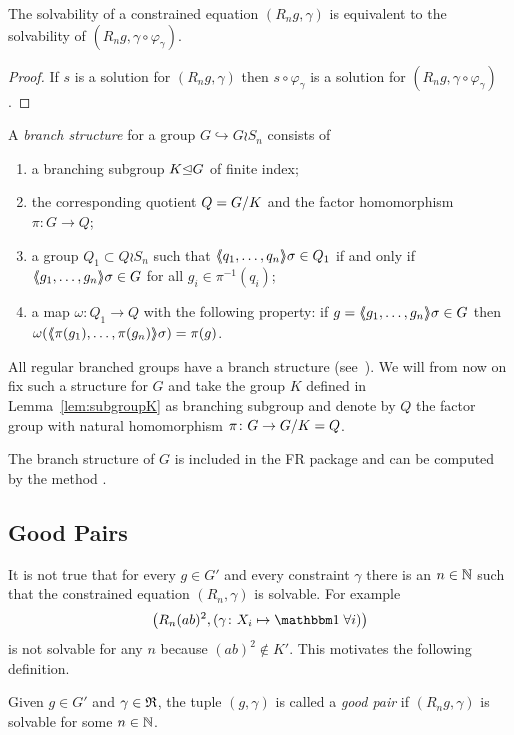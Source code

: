 \documentclass[a4paper,11pt]{amsart}
\begin{document}
\begin{lem} \label{lem:solvabilityWithReducedConstraint}
 The solvability of a constrained equation $(R_n g,\gamma)$ is equivalent to the 
 solvability of $(R_n g,\gamma\circ \varphi_\gamma)$.
\end{lem}
 \begin{proof}
 If $s$ is a solution for $(R_n g,\gamma)$ then $s\circ \varphi_\gamma$ is
 a solution for $(R_n g,\gamma\circ \varphi_\gamma)$. 
\end{proof}


\begin{defi} 
A \emph{branch structure} for a group $G\hookrightarrow G \wr S_n$ consists of  
\begin{enumerate}
 \item a branching subgroup $K{\mathrel\trianglelefteq} G$ of finite index;
 \item the corresponding quotient $Q={G/K}$ and the factor homomorphism $\pi\colon G \to Q$;
 \item a group $Q_1 \subset Q \wr S_n$ such that $\langle\negthickspace\langle q_1,\ldots,q_n\rangle\negthickspace\rangle\sigma\in Q_1$ if
  and only if $\langle\negthickspace\langle g_1,\ldots,g_n\rangle\negthickspace\rangle\sigma \in G$ for all $g_i \in \pi^{-1}(q_i)$;
 \item a map $\omega\colon Q_1 \to Q$ with the following property: if 
      $g=\langle\negthickspace\langle g_1,\ldots,g_n\rangle\negthickspace\rangle\sigma \in G$ then $\omega(\langle\negthickspace\langle\pi(g_1),\ldots,\pi(g_n)\rangle\negthickspace\rangle\sigma) = \pi(g)$.
\end{enumerate}
\end{defi}
All regular branched groups have a branch structure
(see~{\cite[Remark after Definition~5.1]{Bartholdi:RepresentationZetaFunctions}}).
We will from now on fix such a structure for $G$ and take 
the group $K$ defined in Lemma~\ref{lem:subgroupK} as branching subgroup and 
denote by $Q$ the factor group with natural homomorphism $\pi\colon G \to {G/K}=Q$.

\begin{re}
  The branch structure of $G$ is included in the FR package and can be
  computed by the method .
\end{re}

\subsection{Good Pairs}\label{sec:good_pairs}
It is not true that for every $g\in G'$ and every constraint $\gamma$
there is an $n\in\mathbb{N}$ such that the constrained equation
$(R_n,\gamma)$ is solvable. For example
\[\left(R_n(ab)^2,(\gamma\colon X_i\mapsto\id\;\forall i)\right)\] 
is not solvable for any $n$ because $(ab)^2\notin K'$.  This motivates
the following definition.
\begin{defi}
Given $g\in G'$ and $\gamma\in\mathfrak{R}$, the tuple $(g,\gamma)$ is called a \emph{good pair} if 
$(R_ng,\gamma)$ is solvable for some $n\in\mathbb{N}$.  
\end{defi}
\end{document}
